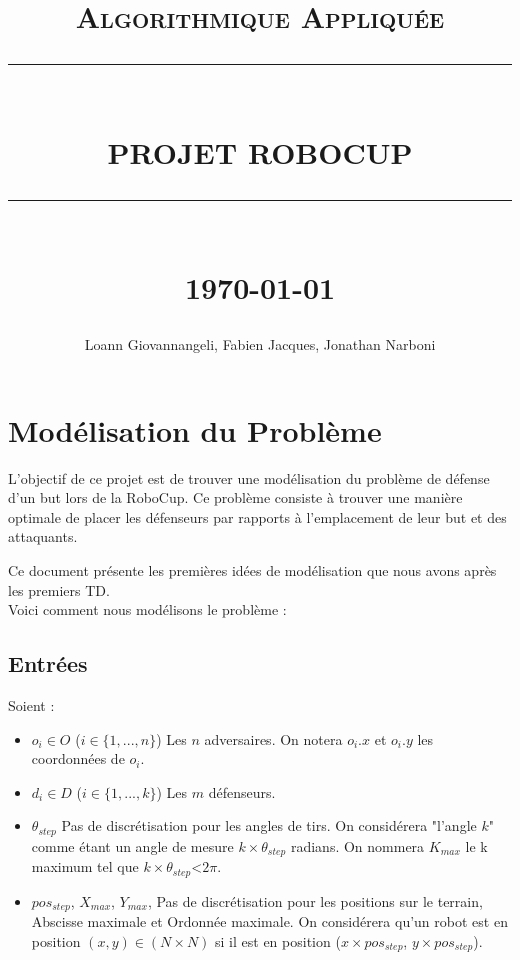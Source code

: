 \documentclass[12pt]{report}
\newcommand{\HRule}[1]{\rule{\linewidth}{#1}}
\begin{document}
\title{ \normalsize \textsc{Algorithmique Appliquée}
		\\ [2.0cm]
		\HRule{0.5pt} \\
		\LARGE \textbf{\uppercase{Projet RoboCup}}
		\HRule{2pt} \\ [0.5cm]
		\normalsize \today \vspace*{5\baselineskip}}

\date{}

\author{
		Loann Giovannangeli, Fabien Jacques, Jonathan Narboni}

\maketitle
\renewcommand{\contentsname}{Sommaire}
\tableofcontents
\newpage

\sectionfont{\scshape}


\chapter*{Modélisation du Problème}

L'objectif de ce projet est de trouver une modélisation du problème de défense d'un but lors de la RoboCup. Ce problème consiste à trouver une manière optimale de placer les défenseurs par rapports à l'emplacement de leur but et des attaquants.

Ce document présente les premières idées de modélisation que nous avons après les premiers TD.\\

Voici comment nous modélisons le problème :
\newline
\newline
\section{Entrées}
Soient :
\begin{itemize}
\item $o_i \in O$ ($i \in \{1,..., n\}$) Les $n$ adversaires. On notera $o_i.x$ et $o_i.y$ les coordonnées de $o_i$.
\item $d_i \in D$ ($i \in \{1,..., k\}$) Les $m$ défenseurs.
\item $\theta_{step}$ Pas de discrétisation pour les angles de tirs. On considérera "l'angle $k$" comme étant un angle de mesure $k \times \theta_{step}$ radians. On nommera $K_{max}$ le k maximum tel que $k \times \theta_{step} $<$ 2 \pi$.
\item $pos_{step}$, $X_{max}$, $Y_{max}$, Pas de discrétisation pour les positions sur le terrain, Abscisse  maximale et Ordonnée maximale. On considérera qu'un robot est en position $(x, y) \in (N \times N)$ si il est en position ($x \times pos_{step}$, $y \times pos_{step}$).
\end{itemize}
\end{document}
